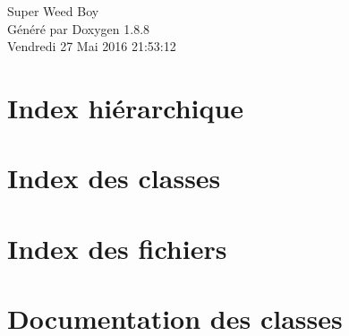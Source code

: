\documentclass[twoside]{book}
\newcommand{\+}{\discretionary{\mbox{\scriptsize$\hookleftarrow$}}{}{}}
\newcommand{\clearemptydoublepage}{%
  \newpage{\pagestyle{empty}\cleardoublepage}%
}
\begin{document}
\hypersetup{pageanchor=false,
             bookmarks=true,
             bookmarksnumbered=true,
             pdfencoding=unicode
            }
\begin{titlepage}
\vspace*{7cm}
\begin{center}%
{\Large Super Weed Boy }\\
\vspace*{1cm}
{\large Généré par Doxygen 1.8.8}\\
\vspace*{0.5cm}
{\small Vendredi 27 Mai 2016 21:53:12}\\
\end{center}
\end{titlepage}
\clearemptydoublepage
\tableofcontents
\clearemptydoublepage
{}
\hypersetup{pageanchor=true}

\chapter{Index hiérarchique}

\chapter{Index des classes}

\chapter{Index des fichiers}

\chapter{Documentation des classes}




























































\end{document}
